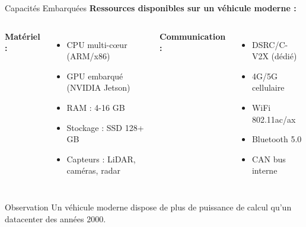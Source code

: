﻿\documentclass[aspectratio=169,11pt]{beamer}
\begin{document}
\begin{frame}{Capacit\'es Embarqu\'ees}
\textbf{Ressources disponibles sur un v\'ehicule moderne :}

\begin{columns}
\textbf{Mat\'eriel :}
\begin{itemize}
    \item CPU multi-c\oe ur (ARM/x86)
    \item GPU embarqu\'e (NVIDIA Jetson)
    \item RAM : 4-16 GB
    \item Stockage : SSD 128+ GB
    \item Capteurs : LiDAR, cam\'eras, radar
\end{itemize}

\textbf{Communication :}
\begin{itemize}
    \item DSRC/C-V2X (d\'edi\'e)
    \item 4G/5G cellulaire
    \item WiFi 802.11ac/ax
    \item Bluetooth 5.0
    \item CAN bus interne
\end{itemize}
\end{columns}

\vspace{0.5cm}
\begin{alertblock}{Observation}
Un v\'ehicule moderne dispose de plus de puissance de calcul qu'un datacenter des ann\'ees 2000.
\end{alertblock}
\end{frame}
\end{document}
